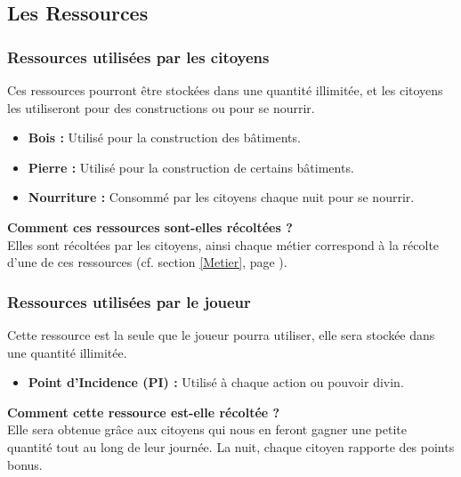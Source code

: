 \documentclass[a4paper]{memoir}
\begin{document}
				
			\subsection{Les Ressources}
		
				\subsubsection{Ressources utilisées par les citoyens}
					Ces ressources pourront être stockées dans une quantité illimitée, et les citoyens les utiliseront pour des constructions ou pour se nourrir.
					\begin{itemize}[label=$\bullet$]
						\item \textbf{Bois :} Utilisé pour la construction des bâtiments.
						\item \textbf{Pierre :} Utilisé pour la construction de certains bâtiments.
						\item \textbf{Nourriture :} Consommé par les citoyens chaque nuit pour se nourrir.
					\end{itemize}
					\textbf{Comment ces ressources sont-elles récoltées ? }\\
					Elles sont récoltées par les citoyens, ainsi chaque métier correspond à la récolte d'une de ces ressources (cf. section \ref{Metier}, page \pageref{Metier}).

				\subsubsection{Ressources utilisées par le joueur}
					Cette ressource est la seule que le joueur pourra utiliser, elle sera stockée dans une quantité illimitée.
					\begin{itemize}[label=$\bullet$]
						\item \textbf{Point d'Incidence (PI) :} Utilisé à chaque action ou pouvoir divin.
					\end{itemize}
					\textbf{Comment cette ressource est-elle récoltée ? }\\
					Elle sera obtenue grâce aux citoyens qui nous en feront gagner une petite quantité tout au long de leur journée. La nuit, chaque citoyen rapporte des points bonus.
\end{document}
